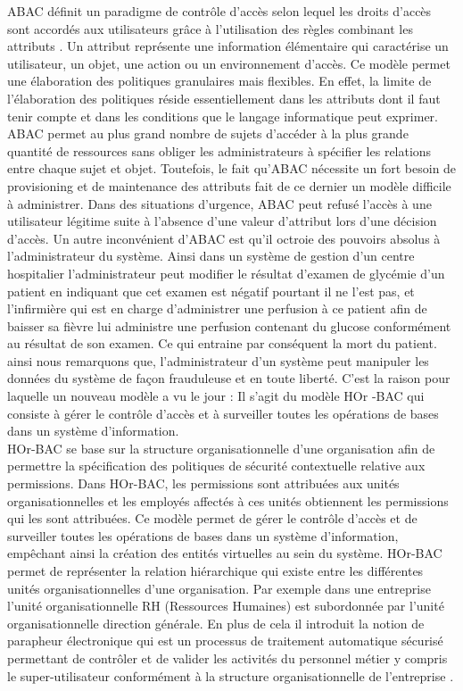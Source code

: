   \hspace*{0.5cm} ABAC définit un paradigme de contrôle d'accès selon lequel les droits d'accès sont accordés aux utilisateurs grâce à l'utilisation des règles combinant les attributs \cite{Vin15}. Un attribut représente une information élémentaire qui caractérise un utilisateur, un objet, une action ou un environnement d'accès. Ce modèle permet une élaboration des politiques granulaires mais flexibles. En effet, la limite de l'élaboration des politiques réside essentiellement dans les attributs dont il faut tenir compte et dans les conditions que le langage informatique peut exprimer. ABAC permet au plus grand nombre de sujets d'accéder à la plus grande quantité de ressources sans obliger les administrateurs à spécifier les relations entre chaque sujet et objet. Toutefois, le fait qu'ABAC nécessite un fort besoin de provisioning et de maintenance des attributs fait de ce dernier un modèle difficile à administrer. Dans des situations d'urgence, ABAC peut refusé l'accès à une utilisateur légitime suite à l'absence d'une valeur d'attribut lors d'une décision d'accès. Un autre inconvénient d'ABAC est qu'il octroie des pouvoirs absolus à l'administrateur du système. Ainsi dans un système de gestion d'un centre hospitalier l'administrateur peut modifier le résultat d'examen de glycémie d'un patient en indiquant que cet examen est négatif pourtant  il ne l'est pas, et l'infirmière qui est en charge d'administrer une perfusion à ce patient afin de baisser sa fièvre lui administre une perfusion contenant du glucose conformément au résultat de son examen. Ce qui entraine par conséquent la mort du patient. ainsi nous remarquons que, l'administrateur d'un système peut manipuler les données du système de façon frauduleuse et en toute liberté. C'est la raison pour laquelle un nouveau modèle a vu le jour : Il s'agit du modèle HOr -BAC qui consiste à gérer le contrôle d'accès et à surveiller toutes les opérations de bases dans un système d'information.\\
  \hspace*{0.5cm} HOr-BAC se base sur la structure organisationnelle d'une organisation afin de permettre la spécification des politiques de sécurité contextuelle relative aux permissions. Dans HOr-BAC, les permissions sont attribuées aux unités organisationnelles et les employés affectés à ces unités obtiennent les permissions qui les sont attribuées. Ce modèle permet de gérer le contrôle d'accès et de surveiller toutes les opérations de bases dans un système d'information, empêchant ainsi la création des entités virtuelles au sein du système. HOr-BAC permet de représenter la relation hiérarchique qui existe entre les différentes unités organisationnelles d'une organisation. Par exemple dans une entreprise l'unité organisationnelle RH (Ressources Humaines) est subordonnée par l'unité organisationnelle direction générale. En plus de cela il introduit la notion de parapheur électronique qui est un processus de traitement automatique sécurisé permettant de contrôler et de valider les activités du personnel métier y compris le super-utilisateur conformément à la structure organisationnelle de l'entreprise \cite{theseBenoit}. 



